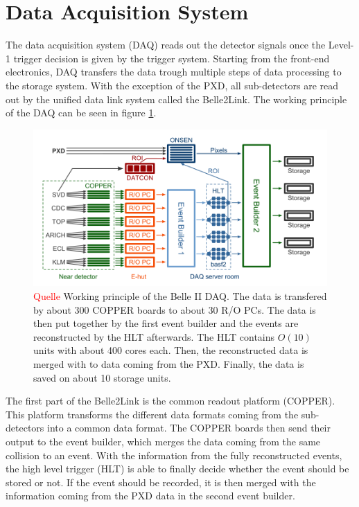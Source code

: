 \documentclass[a4paper,11pt,twosided,final,german,openbib,pdftex,listof=totoc,bibliography=totoc]{scrbook}
\begin{document}
\section{Data Acquisition System}
\label{sec:DAQ}

The data acquisition system (DAQ) reads out the detector signals once the Level-1 trigger decision is given by the trigger system. Starting from the front-end electronics, DAQ transfers the data trough multiple steps of data processing to the storage system. With the exception of the PXD, all sub-detectors are read out by the unified data link system called the Belle2Link. The working principle of the DAQ can be seen in figure \ref{fig:DAQ}.

\begin{figure}[h!]
	\centering
	\includegraphics[width=\textwidth]{Bilder/DAQ}
	\caption[Working Principle of the DAQ]{\textcolor{red}{Quelle} Working principle of the Belle II DAQ. The data is transfered by about 300 COPPER boards to about 30 R/O PCs. The data is then put together by the first event builder and the events are reconstructed by the HLT afterwards. The HLT contains $O(10)$ units with about 400 cores each. Then, the reconstructed data is merged with to data coming from the PXD. Finally, the data is saved on about 10 storage units.}
	\label{fig:DAQ}
\end{figure}

The first part of the Belle2Link is the common readout platform (COPPER). This platform transforms the different data formats coming from the sub-detectors into a common data format. The COPPER boards then send their output to the event builder, which merges the data coming from the same collision to an event. With the information from the fully reconstructed events, the high level trigger (HLT) is able to finally decide whether the event should be stored or not. If the event should be recorded, it is then merged with the information coming from the PXD data in the second event builder.
\end{document}
